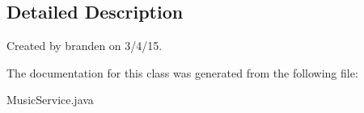 \subsection{Detailed Description}
Created by branden on 3/4/15. 

The documentation for this class was generated from the following file\+:\begin{DoxyCompactItemize}
\item 
Music\+Service.\+java\end{DoxyCompactItemize}
